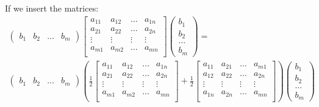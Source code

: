 \documentclass[12pt]{article}
\begin{document}
\begin{enumerate}
    If we insert the matrices:
    \begin{align*}
        \begin{pmatrix}
            b_1     &
            b_2     &
            \dots  &
            b_m
        \end{pmatrix} 
        \begin{bmatrix}
            a_{11}    &   a_{12}    & \dots     &   a_{1n}    \\
            a_{21}    &   a_{22}    & \dots     &   a_{2n}    \\
            \vdots    &  \vdots     & \vdots    &   \vdots    \\   
            a_{m1}    &   a_{m2}    & \dots     &   a_{mn}    \\
        \end{bmatrix}
        \begin{pmatrix}
            b_1     \\
            b_2     \\
            \dots  \\
            b_m
        \end{pmatrix}
        = \\
        \begin{pmatrix}
            b_1     &
            b_2     &
            \dots  &
            b_m
        \end{pmatrix} (\frac{1}{2} 
        \begin{bmatrix}
            a_{11}    &   a_{12}    & \dots     &   a_{1n}    \\
            a_{21}    &   a_{22}    & \dots     &   a_{2n}    \\
            \vdots    &  \vdots     & \vdots    &   \vdots    \\   
            a_{m1}    &   a_{m2}    & \dots     &   a_{mn}    \\
        \end{bmatrix}
         + \frac{1}{2}
        \begin{bmatrix}
            a_{11}    &   a_{21}    & \dots     &   a_{m1}    \\
            a_{12}    &   a_{22}    & \dots     &   a_{2n}    \\
            \vdots    &  \vdots     & \vdots    &   \vdots    \\   
            a_{1n}    &   a_{2n}    & \dots     &   a_{mn}    \\
        \end{bmatrix})
        \begin{pmatrix}
            b_1     \\
            b_2     \\
            \dots  \\
            b_m
        \end{pmatrix}
    \end{align*}


\end{enumerate}
\end{document}
